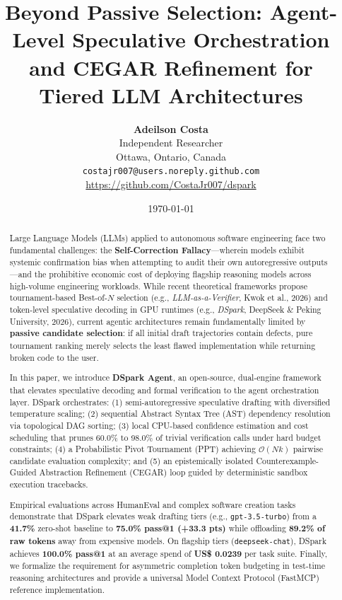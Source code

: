 \documentclass[10pt,twocolumn,letterpaper]{article}
\title{\textbf{\Large Beyond Passive Selection: Agent-Level Speculative Orchestration and CEGAR Refinement for Tiered LLM Architectures}}
\author{
    \textbf{Adeilson Costa} \\
    Independent Researcher \\
    Ottawa, Ontario, Canada \\
    \texttt{costajr007@users.noreply.github.com} \\
    \url{https://github.com/CostaJr007/dspark}
}
\date{\today}
\begin{document}
\maketitle

\begin{abstract}
Large Language Models (LLMs) applied to autonomous software engineering face two fundamental challenges: the \textbf{Self-Correction Fallacy}---wherein models exhibit systemic confirmation bias when attempting to audit their own autoregressive outputs---and the prohibitive economic cost of deploying flagship reasoning models across high-volume engineering workloads. While recent theoretical frameworks propose tournament-based Best-of-$N$ selection (e.g., \textit{LLM-as-a-Verifier}, Kwok et al., 2026) and token-level speculative decoding in GPU runtimes (e.g., \textit{DSpark}, DeepSeek \& Peking University, 2026), current agentic architectures remain fundamentally limited by \textbf{passive candidate selection}: if all initial draft trajectories contain defects, pure tournament ranking merely selects the least flawed implementation while returning broken code to the user.

In this paper, we introduce \textbf{DSpark Agent}, an open-source, dual-engine framework that elevates speculative decoding and formal verification to the agent orchestration layer. DSpark orchestrates: (1) semi-autoregressive speculative drafting with diversified temperature scaling; (2) sequential Abstract Syntax Tree (AST) dependency resolution via topological DAG sorting; (3) local CPU-based confidence estimation and cost scheduling that prunes 60.0\% to 98.0\% of trivial verification calls under hard budget constraints; (4) a Probabilistic Pivot Tournament (PPT) achieving $\mathcal{O}(Nk)$ pairwise candidate evaluation complexity; and (5) an epistemically isolated Counterexample-Guided Abstraction Refinement (CEGAR) loop guided by deterministic sandbox execution tracebacks.

Empirical evaluations across HumanEval and complex software creation tasks demonstrate that DSpark elevates weak drafting tiers (e.g., \texttt{gpt-3.5-turbo}) from a \textbf{41.7\%} zero-shot baseline to \textbf{75.0\% pass@1 (+33.3 pts)} while offloading \textbf{89.2\% of raw tokens} away from expensive models. On flagship tiers (\texttt{deepseek-chat}), DSpark achieves \textbf{100.0\% pass@1} at an average spend of \textbf{US\$ 0.0239} per task suite. Finally, we formalize the requirement for asymmetric completion token budgeting in test-time reasoning architectures and provide a universal Model Context Protocol (FastMCP) reference implementation.
\end{abstract}
\end{document}

